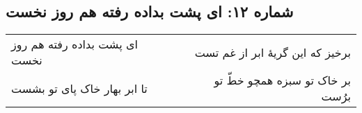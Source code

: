 \begin{center}
\section*{شماره ۱۲: ای پشت بداده رفته هم روز نخست}
\label{sec:012}
\begin{longtable}{l p{0.5cm} r}
ای پشت بداده رفته هم روز نخست
&&
برخیز که این گریهٔ ابر از غم تست
\\
تا ابر بهار خاک پای تو بشست
&&
بر خاک تو سبزه همچو خطّ تو برُست
\\
\end{longtable}
\end{center}
